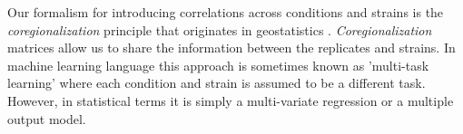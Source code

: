 
Our formalism for introducing correlations across conditions and strains is the \emph{coregionalization} principle \cite{Alvarez:2011} that originates in geostatistics \cite{Wackernagel:2003}. \emph{Coregionalization} matrices allow us to share the information between the replicates and strains. In machine learning language this approach is sometimes known as 'multi-task learning' where each condition and strain is assumed to be a different task. However, in statistical terms it is simply a multi-variate regression or a multiple output model.

